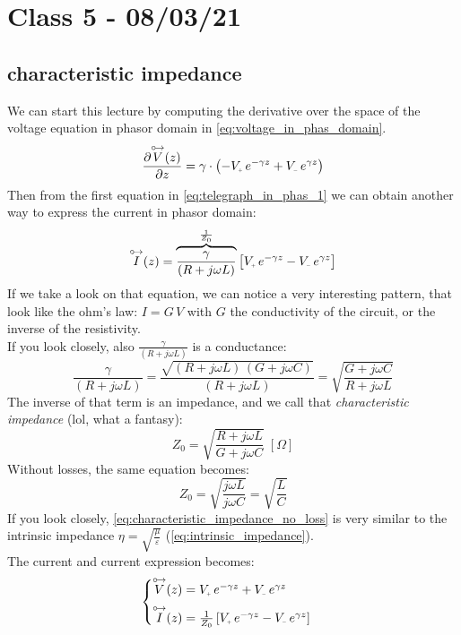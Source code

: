 \section{Class 5 - 08/03/21}
\subsection*{characteristic impedance}
We can start this lecture by computing the derivative over the space of the voltage equation in phasor domain in \cref{eq:voltage_in_phas_domain}.
\begin{equation}
    \frac{\partial \phas{V}(z)}{\partial z}=\gamma \cdot \left(-V\bottomPlus\,e^{-\gamma z}+V\bottomMinus \,e^{\gamma z}\right) 
\end{equation}
Then from the first equation in \cref{eq:telegraph_in_phas_1} we can obtain another way to express the current in phasor domain:
\begin{equation}
    \phas{I}(z)=\overbrace{\frac{\gamma}{(R+j\omega L)}}^{\frac{1}{Z_0}}\left[V\bottomPlus \,e^{-\gamma z}-V\bottomMinus \,e^{\gamma z}\right]
\end{equation}
If we take a look on that equation, we can notice a very interesting pattern, that look like the ohm's law: $I=G\,V$ with $G$ the conductivity of the circuit, or the inverse of the resistivity.\\
If you look closely, also $\frac{\gamma}{(R+j\omega L)}$ is a conductance:
\begin{equation}
    \frac{\gamma}{(R+j\omega L)}=\frac{\sqrt{(R+j\omega L)\,(G+j\omega C)}}{(R+j\omega L)}=\sqrt{\frac{G+j\omega C}{R+j\omega L}}
\end{equation}
The inverse of that term is an impedance, and we call that \emph{characteristic impedance} (lol, what a fantasy):
\begin{equation}
    Z_0=\sqrt{\frac{R+j\omega L}{G+j\omega C}}\;\left[\Omega \right]
\end{equation}
Without losses, the same equation becomes:
\begin{equation} \label{eq:characteristic_impedance_no_loss}
    Z_0=\sqrt{\frac{j\omega L}{j\omega C}}=\sqrt{\frac{L}{C}}
\end{equation}
If you look closely, \cref{eq:characteristic_impedance_no_loss} is very similar to the intrinsic impedance $\eta = \sqrt{\frac{\mu}{\varepsilon}}$ (\cref{eq:intrinsic_impedance}).\\
The current and current expression becomes:
\begin{equation}
    \begin{cases}
    \phas{V}(z) = V\bottomPlus \,e^{-\gamma z}+V\bottomMinus \,e^{\gamma z} \\[5pt]
    \phas{I}(z)=\frac{1}{Z_0}\left[V\bottomPlus \,e^{-\gamma z}-V\bottomMinus \,e^{\gamma z}\right]
    \end{cases}\label{eq:current_and_voltage_in_TL_phas}
\end{equation}

